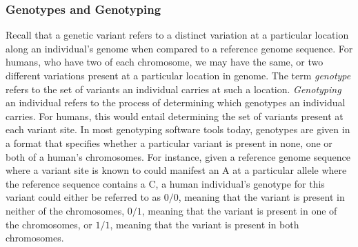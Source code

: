 \subsubsection{Genotypes and Genotyping} \label{background:biology:genotype_and_genotyping}
Recall that a genetic variant refers to a distinct variation at a particular location along an individual's genome when compared to a reference genome sequence.
For humans, who have two of each chromosome, we may have the same, or two different variations present at a particular location in genome.
The term \textit{genotype} refers to the set of variants an individual carries at such a location.
\textit{Genotyping} an individual refers to the process of determining which genotypes an individual carries. 
For humans, this would entail determining the set of variants present at each variant site.
In most genotyping software tools today, genotypes are given in a format that specifies whether a particular variant is present in none, one or both of a human's chromosomes.
For instance, given a reference genome sequence where a variant site is known to could manifest an A at a particular allele where the reference sequence contains a C, a human individual's genotype for this variant could either be referred to as $0/0$, meaning that the variant is present in neither of the chromosomes, $0/1$, meaning that the variant is present in one of the chromosomes, or $1/1$, meaning that the variant is present in both chromosomes.


